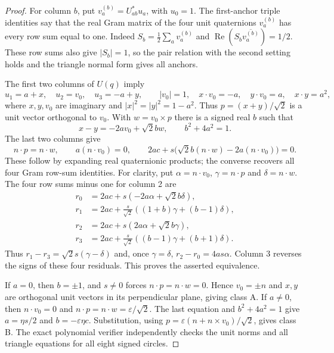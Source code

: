\documentclass[11pt]{article}
\begin{document}
\begin{proof}
For column $b$, put $v_a^{(b)}=U_{ab}^*u_a$, with $u_0=1$.
The first-anchor triple identities say that the real Gram matrix of
the four unit quaternions $v_a^{(b)}$ has every row sum equal to one.
Indeed $S_b=\frac12\sum_a v_a^{(b)}$ and
$\operatorname{Re}(S_b\overline{v_a^{(b)}})=1/2$.
These row sums also give $|S_b|=1$, so the pair relation with the
second setting holds and the triangle normal form gives all anchors.

The first two columns of $U(q)$ imply
\[
 u_1=a+x,\quad u_2=v_0,\quad u_3=-a+y,
 \qquad |v_0|=1,\quad
 x\cdot v_0=-a,\quad y\cdot v_0=a,\quad x\cdot y=a^2,
\]
where $x,y,v_0$ are imaginary and $|x|^2=|y|^2=1-a^2$.
Thus $p=(x+y)/\sqrt2$ is a unit vector orthogonal to $v_0$.
With $w=v_0\times p$ there is a signed real $b$ such that
\[
 x-y=-2av_0+\sqrt2 b w,\qquad b^2+4a^2=1.
\]
The last two columns give
\[
 n\cdot p=n\cdot w,\qquad a(n\cdot v_0)=0,\qquad
 2ac+s\bigl(\sqrt2 b(n\cdot w)-2a(n\cdot v_0)\bigr)=0.
\]
These follow by expanding real quaternionic products; the converse
recovers all four Gram row-sum identities.
For clarity, put $\alpha=n\cdot v_0$, $\gamma=n\cdot p$ and
$\delta=n\cdot w$. The four row sums minus one for column 2 are
\[
\begin{split}
 r_0&=2ac+s(-2a\alpha+\sqrt2 b\delta),\\
 r_1&=2ac+\frac{s}{\sqrt2}((1+b)\gamma+(b-1)\delta),\\
 r_2&=2ac+s(2a\alpha+\sqrt2 b\gamma),\\
 r_3&=2ac+\frac{s}{\sqrt2}((b-1)\gamma+(b+1)\delta).
\end{split}
\]
Thus $r_1-r_3=\sqrt2 s(\gamma-\delta)$ and, once
$\gamma=\delta$, $r_2-r_0=4as\alpha$. Column 3 reverses the
signs of these four residuals. This proves the asserted equivalence.

If $a=0$, then $b=\pm1$, and $s\ne0$ forces
$n\cdot p=n\cdot w=0$. Hence $v_0=\pm n$ and $x,y$ are orthogonal
unit vectors in its perpendicular plane, giving class A.
If $a\ne0$, then $n\cdot v_0=0$ and
$n\cdot p=n\cdot w=\varepsilon/\sqrt2$.
The last equation and $b^2+4a^2=1$ give
$a=\eta s/2$ and $b=-\varepsilon\eta c$.
Substitution, using $p=\varepsilon(n+n\times v_0)/\sqrt2$, gives class B.
The exact polynomial verifier independently checks the unit norms and
all triangle equations for all eight signed circles.
\end{proof}
\end{document}

